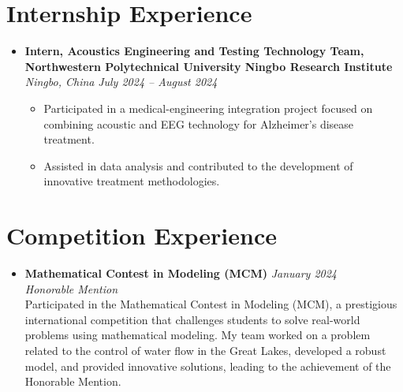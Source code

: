 \documentclass[a4paper,10pt]{article}
\begin{document}
\section*{Internship Experience}
\begin{itemize}[leftmargin=0.5cm]
	\item \textbf{Intern, Acoustics Engineering and Testing Technology Team, Northwestern Polytechnical University Ningbo Research Institute} \\
	\textit{Ningbo, China} \hfill \textit{July 2024 -- August 2024} 
	
	\begin{itemize}
		\item Participated in a medical-engineering integration project focused on combining acoustic and EEG technology for Alzheimer's disease treatment.
		\item Assisted in data analysis and contributed to the development of innovative treatment methodologies.
	\end{itemize}
\end{itemize}

\section*{Competition Experience}
\begin{itemize}[leftmargin=0.5cm]
    \item \textbf{Mathematical Contest in Modeling (MCM)} \hfill \textit{January 2024} \\
    \textit{Honorable Mention} \\
    Participated in the Mathematical Contest in Modeling (MCM), 
    a prestigious international competition that challenges students to solve real-world problems using mathematical modeling. 
    My team worked on a problem related to the control of water flow in the Great Lakes, developed a robust model, and provided innovative solutions, 
    leading to the achievement of the Honorable Mention.
\end{itemize}

\end{document}
